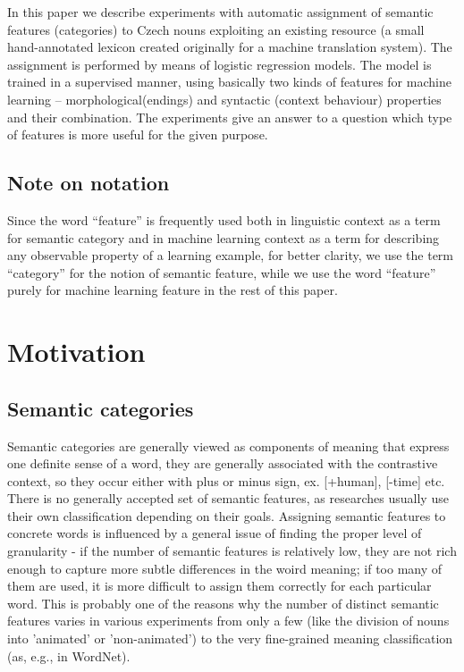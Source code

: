 \documentclass[letterpaper]{article}
\begin{document}
In this paper we describe experiments with automatic assignment of semantic features (categories) to Czech nouns
exploiting an existing resource (a small hand-annotated lexicon created originally for a machine translation system).
The assignment is performed by means of logistic regression models. The model is trained in a supervised manner, using 
basically two kinds of features for machine learning --  morphological(endings) and syntactic (context behaviour) properties and their combination. The experiments give an answer to a question which type of features is more useful for the given purpose.   

\subsection{Note on notation}
Since the word ``feature'' is frequently used both in linguistic context as a term for semantic category and in 
machine learning context as a term for describing any observable property of a learning example, for 
better clarity, we use the term ``category'' for the notion of semantic feature, 
while we use the word ``feature'' purely for machine learning feature in the rest of this paper.


\section{Motivation}
\subsection{Semantic categories}
Semantic categories are generally viewed as components of meaning
that express one definite sense of a word, they are generally associated
with the contrastive context, so they occur either with plus or minus
sign, ex. [+human], [-time] etc. 
There is no generally accepted set of semantic features, as researches
usually use their own classification depending on their goals. Assigning 
semantic features to concrete words is influenced by a general issue 
of finding the proper level of granularity - if the number of semantic features is relatively 
low, they are not rich enough to capture more subtle differences in the woird meaning;
if too many of them are used, it is more difficult to assign them correctly
for each particular word. This is probably one of the reasons why the 
number of distinct semantic features varies in various experiments 
from only a few (like
the division of nouns into 'animated' or 'non-animated') to the very
fine-grained meaning classification (as, e.g., in WordNet).
\end{document}
